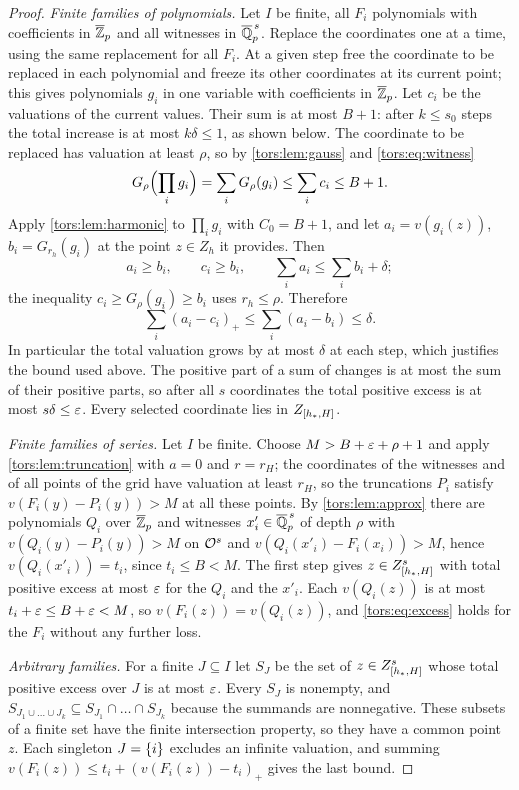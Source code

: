 \begin{proof}
\emph{Finite families of polynomials.} Let $I$ be finite, all $F_i$ polynomials with
coefficients in $\overline{\mathbb{Z}}_p$ and all witnesses in $\overline{\mathbb{Q}}_p^{\,s}$. Replace
the coordinates one at a time, using the same replacement for all $F_i$. At a given step
free the coordinate to be replaced in each polynomial and freeze its other coordinates at
its current point; this gives polynomials $g_i$ in one variable with coefficients in
$\overline{\mathbb{Z}}_p$.
Let $c_i$ be the valuations of the current values. Their sum is at most $B+1$: after
$k\le s_0$ steps the total increase is at most $k\delta\le1$, as shown below. The
coordinate to be replaced has valuation at least $\rho$, so by \cref{tors:lem:gauss} and
\eqref{tors:eq:witness}
\[
  G_\rho\Bigl(\prod_ig_i\Bigr)=\sum_iG_\rho(g_i)\le\sum_ic_i\le B+1 .
\]
Apply \cref{tors:lem:harmonic} to $\prod_ig_i$ with $C_0=B+1$, and let
$a_i=v(g_i(z))$, $b_i=G_{r_h}(g_i)$ at the point $z\in Z_h$ it provides. Then
\[
  a_i\ge b_i,\qquad c_i\ge b_i,\qquad \sum_ia_i\le\sum_ib_i+\delta ;
\]
the inequality $c_i\ge G_\rho(g_i)\ge b_i$ uses $r_h\le\rho$. Therefore
\[
  \sum_i(a_i-c_i)_+\le\sum_i(a_i-b_i)\le\delta .
\]
In particular the total valuation grows by at most $\delta$ at each step, which justifies
the bound used above. The positive part of a sum of changes is at most the sum of their
positive parts, so after all $s$ coordinates the total positive excess is at most
$s\delta\le\varepsilon$. Every selected coordinate lies in $Z_{[h_*,H]}$.

\emph{Finite families of series.} Let $I$ be finite. Choose $M>B+\varepsilon+\rho+1$ and apply
\cref{tors:lem:truncation} with $a=0$ and $r=r_H$; the coordinates of the witnesses and
of all points of the grid have valuation at least $r_H$, so the truncations $P_i$ satisfy
$v(F_i(y)-P_i(y))>M$ at all these points. By \cref{tors:lem:approx} there are
polynomials $Q_i$ over $\overline{\mathbb{Z}}_p$ and witnesses $x'_i\in\overline{\mathbb{Q}}_p^{\,s}$ of
depth $\rho$ with $v(Q_i(y)-P_i(y))>M$ on $\mathcal{O}^s$ and $v(Q_i(x'_i)-F_i(x_i))>M$, hence
$v(Q_i(x'_i))=t_i$, since $t_i\le B<M$. The first step gives $z\in Z_{[h_*,H]}^s$ with
total positive excess at most $\varepsilon$ for the $Q_i$ and the $x'_i$. Each $v(Q_i(z))$ is at
most $t_i+\varepsilon\le B+\varepsilon<M$, so $v(F_i(z))=v(Q_i(z))$, and \eqref{tors:eq:excess} holds
for the $F_i$ without any further loss.

\emph{Arbitrary families.} For a finite $J\subseteq I$ let $S_J$ be the set of
$z\in Z_{[h_*,H]}^s$ whose total positive excess over $J$ is at most $\varepsilon$. Every $S_J$
is nonempty, and $S_{J_1\cup\dots\cup J_k}\subseteq S_{J_1}\cap\dots\cap S_{J_k}$ because
the summands are nonnegative. These subsets of a finite set have the finite intersection
property, so they have a common point $z$. Each singleton $J=\{i\}$ excludes an
infinite valuation, and summing $v(F_i(z))\le t_i+(v(F_i(z))-t_i)_+$ gives the last
bound.
\end{proof}

